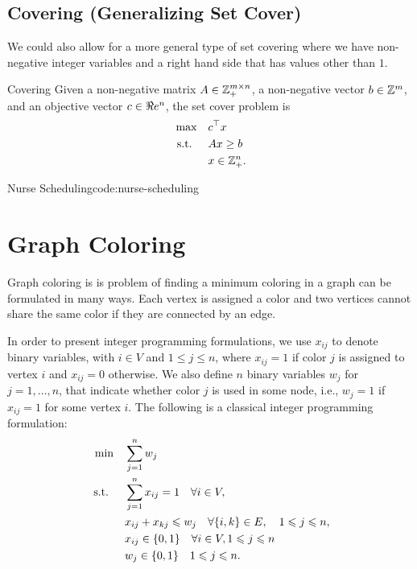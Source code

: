 \subsection{Covering (Generalizing Set Cover)}
We could also allow for a more general type of set covering where we have non-negative integer variables and a right hand side that has values other than $1$.
\begin{general}{Covering}{\npcomplete}
\label{general:covering}
Given a non-negative matrix $A \in \mathbb{Z}_+^{m \times n}$, a non-negative vector $b \in \mathbb{Z}^m$, and an objective vector $c \in \Re e^n$, the set cover problem is
\begin{align*}
\max \quad & c^\top x\\
\mbox{ s.t. } \quad  & Ax \geq b \\
& x \in\mathbb{Z}^n_+.
\end{align*}
\end{general}

%
\begin{examplewithcode}{Nurse Scheduling}{code:nurse-scheduling}
%
\end{examplewithcode}

\section{Graph Coloring}

Graph coloring  is 
is problem of finding a minimum coloring in a graph can be formulated in many ways. Each vertex is assigned a color and two vertices cannot share the same color if they are connected by an edge.

In order to present integer programming formulations, we use $x_{i j}$ to denote binary variables, with $i \in V$ and $1 \leqslant j \leqslant n$, where $x_{i j}=1$ if color $j$ is assigned to vertex $i$ and $x_{i j}=0$ otherwise. We also define $n$ binary variables $w_j$ for $j=1, \ldots, n$, that indicate whether color $j$ is used in some node, i.e., $w_j=1$ if $x_{i j}=1$ for some vertex $i$.
The following is a classical integer programming formulation:
\begin{align*}
\min \quad & \sum_{j=1}^n w_j \\
\mbox{ s.t. } \quad  & \sum_{j=1}^n x_{i j}=1 \quad \forall i \in V, \\
& x_{i j}+x_{k j} \leqslant w_j \quad \forall\{i, k\} \in E, \quad 1 \leqslant j \leqslant n, \\
& x_{i j} \in\{0,1\} \quad \forall i \in V, 1 \leqslant j \leqslant n\\
& w_j \in\{0,1\} \quad 1 \leqslant j \leqslant n .
\end{align*}


